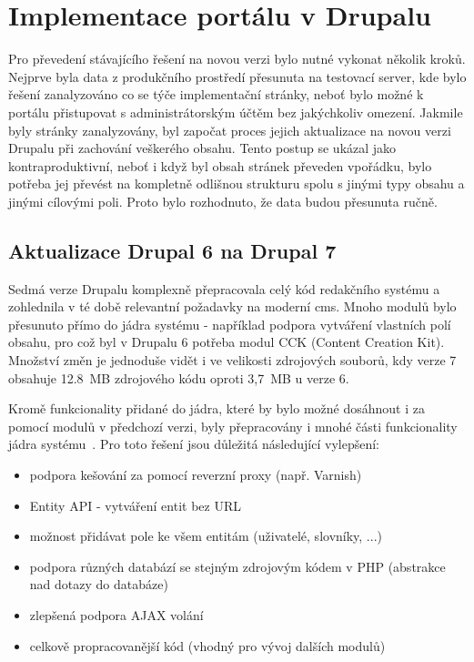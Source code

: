 \chapter{Implementace portálu v Drupalu}
\label{chap:implementace-drupal}

Pro převedení stávajícího řešení na novou verzi bylo nutné vykonat několik kroků. Nejprve byla data z produkčního prostředí přesunuta na testovací server, kde bylo řešení zanalyzováno co se týče implementační stránky, neboť bylo možné k portálu přistupovat s administrátorským účtěm bez jakýchkoliv omezení. Jakmile byly stránky zanalyzovány, byl započat proces jejich aktualizace na novou verzi Drupalu při zachování veškerého obsahu. Tento postup se ukázal jako kontraproduktivní, neboť i když byl obsah stránek převeden vpořádku, bylo potřeba jej převést na kompletně odlišnou strukturu spolu s jinými typy obsahu a jinými cílovými poli. Proto bylo rozhodnuto, že data budou přesunuta ručně.

\section{Aktualizace Drupal 6 na Drupal 7}
Sedmá verze Drupalu komplexně přepracovala celý kód redakčního systému a zohlednila v té době relevantní požadavky na moderní \gls{cms}. Mnoho modulů bylo přesunuto přímo do jádra systému - například podpora vytváření vlastních polí obsahu, pro což byl v Drupalu 6 potřeba modul CCK (Content Creation Kit). Množství změn je jednoduše vidět i ve velikosti zdrojových souborů, kdy verze 7 obsahuje 12.8~MB zdrojového kódu oproti 3,7~MB u verze 6.

Kromě funkcionality přidané do jádra, které by bylo možné dosáhnout i za pomocí modulů v předchozí verzi, byly přepracovány i mnohé části funkcionality jádra systému~\cite{website:drupal-comparison}. Pro toto řešení jsou důležitá následující vylepšení:

\begin{itemize}
  \item podpora kešování za pomocí reverzní proxy (např. Varnish)
  \item Entity API - vytváření entit bez URL
  \item možnost přidávat pole ke všem entitám (uživatelé, slovníky, ...)
  \item podpora různých databází se stejným zdrojovým kódem v PHP (abstrakce nad dotazy do databáze)
  \item zlepšená podpora AJAX volání
  \item celkově propracovanější kód (vhodný pro vývoj dalších modulů)
\end{itemize}

